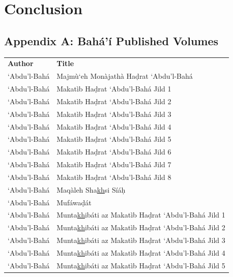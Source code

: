 \documentclass[12pt, oneside]{report}
\begin{document}
\chapter{Conclusion}
\newpage
\begin{appendix}
\chapter*{Appendix A: Bah\'{a}'\'{i} Published Volumes}
\label{app-1}
\begin{table}[ht]
	\setlength{\tabcolsep}{18pt}
	\begin{tabular}{ll}
	\textbf{Author} & \textbf{Title} \\
		`Abdu'l-Bah\'{a}	& Majm\`{u}`eh Mon\`{a}jath\`{a} Ha\d{d}rat `Abdu'l-Bah\'{a} \\
	`Abdu'l-Bah\'{a}	& Makat\`{i}b Ha\d{d}rat `Abdu'l-Bah\'{a} Jild 1 \\
	`Abdu'l-Bah\'{a}	& Makat\`{i}b Ha\d{d}rat `Abdu'l-Bah\'{a} Jild 2 \\
	`Abdu'l-Bah\'{a}	& Makat\`{i}b Ha\d{d}rat `Abdu'l-Bah\'{a} Jild 3 \\
	`Abdu'l-Bah\'{a}	& Makat\`{i}b Ha\d{d}rat `Abdu'l-Bah\'{a} Jild 4 \\
	`Abdu'l-Bah\'{a}	& Makat\`{i}b Ha\d{d}rat `Abdu'l-Bah\'{a} Jild 5 \\
	`Abdu'l-Bah\'{a}	& Makat\`{i}b Ha\d{d}rat `Abdu'l-Bah\'{a} Jild 6 \\
	`Abdu'l-Bah\'{a}	& Makat\`{i}b Ha\d{d}rat `Abdu'l-Bah\'{a} Jild 7 \\
	`Abdu'l-Bah\'{a}	& Makat\`{i}b Ha\d{d}rat `Abdu'l-Bah\'{a} Jild 8 \\
	`Abdu'l-Bah\'{a}	&  Maq\`{a}leh Sha\underline{kh}si S\'{i}\'{a}\d{h} \\
	`Abdu'l-Bah\'{a}	&  Muf\'{a}wa\d{d}\'{a}t \\
	`Abdu'l-Bah\'{a}	& Munta\underline{kh}ib\'{a}ti az Makat\`{i}b Ha\d{d}rat `Abdu'l-Bah\'{a} Jild 1 \\
	`Abdu'l-Bah\'{a}	& Munta\underline{kh}ib\'{a}ti az Makat\`{i}b Ha\d{d}rat `Abdu'l-Bah\'{a} Jild 2 \\
	`Abdu'l-Bah\'{a}	& Munta\underline{kh}ib\'{a}ti az Makat\`{i}b Ha\d{d}rat `Abdu'l-Bah\'{a} Jild 3 \\
	`Abdu'l-Bah\'{a}	& Munta\underline{kh}ib\'{a}ti az Makat\`{i}b Ha\d{d}rat `Abdu'l-Bah\'{a} Jild 4 \\
	`Abdu'l-Bah\'{a}	& Munta\underline{kh}ib\'{a}ti az Makat\`{i}b Ha\d{d}rat `Abdu'l-Bah\'{a} Jild 5 \\

\end{tabular}
\end{table}
\end{appendix}
\end{document}
